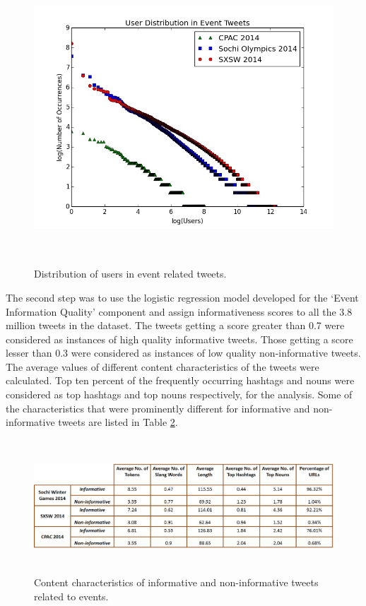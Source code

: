 \begin{figure}[htbp]
  \caption{Distribution of users in event related tweets.}
\label{userdist}
  \centering
    \includegraphics[width=14cm,height=11cm]{Figures/UserDistribution.jpeg}
\end{figure}



The second step was to use the logistic regression model developed for the `Event Information Quality' component and assign informativeness scores to all the 3.8 million tweets in the dataset. The tweets getting a score greater than 0.7 were considered as instances of high quality informative tweets. Those getting a score lesser than 0.3 were considered as instances of low quality non-informative tweets. The average values of different content characteristics of the tweets were calculated. Top ten percent of the frequently occurring hashtags and nouns were considered as top hashtags and top nouns respectively, for the analysis. Some of the characteristics that were prominently different for informative and non-informative tweets are listed in Table \ref{infoanalysis}.

\begin{figure}[htbp]
\centering
\caption{Content characteristics of informative and non-informative tweets related to events.}
    \includegraphics[width=15cm,height=5cm]{Figures/InformationAnalysisTable.jpg}
    
    \label{infoanalysis}
\end{figure}

